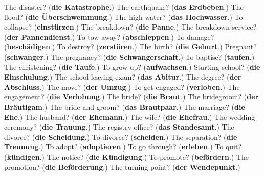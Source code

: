 \begin{tcolorbox}[breakable,colback=teal!4,colframe=teal!35!black,title={Before you move on}]
The disaster? (\textbf{die Katastrophe}.) The earthquake? (\textbf{das Erdbeben}.) The flood? (\textbf{die Überschwemmung}.) The high water? (\textbf{das Hochwasser}.) To collapse? (\textbf{einstürzen}.) The breakdown? (\textbf{die Panne}.) The breakdown service? (\textbf{der Pannendienst}.) To tow away? (\textbf{abschleppen}.) To damage? (\textbf{beschädigen}.) To destroy? (\textbf{zerstören}.) The birth? (\textbf{die Geburt}.) Pregnant? (\textbf{schwanger}.) The pregnancy? (\textbf{die Schwangerschaft}.) To baptise? (\textbf{taufen}.) The christening? (\textbf{die Taufe}.) To grow up? (\textbf{aufwachsen}.) Starting school? (\textbf{die Einschulung}.) The school-leaving exam? (\textbf{das Abitur}.) The degree? (\textbf{der Abschluss}.) The move? (\textbf{der Umzug}.) To get engaged? (\textbf{verloben}.) The engagement? (\textbf{die Verlobung}.) The bride? (\textbf{die Braut}.) The bridegroom? (\textbf{der Bräutigam}.) The bride and groom? (\textbf{das Brautpaar}.) The marriage? (\textbf{die Ehe}.) The husband? (\textbf{der Ehemann}.) The wife? (\textbf{die Ehefrau}.) The wedding ceremony? (\textbf{die Trauung}.) The registry office? (\textbf{das Standesamt}.) The divorce? (\textbf{die Scheidung}.) To divorce? (\textbf{scheiden}.) The separation? (\textbf{die Trennung}.) To adopt? (\textbf{adoptieren}.) To go through? (\textbf{erleben}.) To quit? (\textbf{kündigen}.) The notice? (\textbf{die Kündigung}.) To promote? (\textbf{befördern}.) The promotion? (\textbf{die Beförderung}.) The turning point? (\textbf{der Wendepunkt}.)
\end{tcolorbox}
